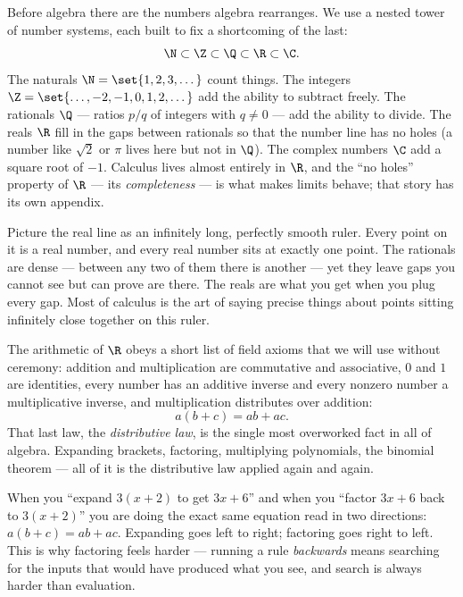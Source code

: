 Before algebra there are the numbers algebra rearranges. We use a nested tower of
number systems, each built to fix a shortcoming of the last:
\[
  \N \subset \Z \subset \Q \subset \R \subset \C.
\]
The naturals $\N = \set{1,2,3,\dots}$ count things. The integers
$\Z = \set{\dots,-2,-1,0,1,2,\dots}$ add the ability to subtract freely. The
rationals $\Q$ --- ratios $p/q$ of integers with $q \neq 0$ --- add the ability to
divide. The reals $\R$ fill in the gaps between rationals so that the number line
has no holes (a number like $\sqrt 2$ or $\pi$ lives here but not in $\Q$). The
complex numbers $\C$ add a square root of $-1$. Calculus lives almost entirely in
$\R$, and the ``no holes'' property of $\R$ --- its \emph{completeness} --- is
what makes limits behave; that story has its own appendix.

\begin{intuitionbox}
Picture the real line as an infinitely long, perfectly smooth ruler. Every point
on it is a real number, and every real number sits at exactly one point. The
rationals are dense --- between any two of them there is another --- yet they leave
gaps you cannot see but can prove are there. The reals are what you get when you
plug every gap. Most of calculus is the art of saying precise things about points
sitting infinitely close together on this ruler.
\end{intuitionbox}

The arithmetic of $\R$ obeys a short list of field axioms that we will use without
ceremony: addition and multiplication are commutative and associative, $0$ and $1$
are identities, every number has an additive inverse and every nonzero number a
multiplicative inverse, and multiplication distributes over addition:
\[
  a(b+c) = ab + ac.
\]
That last law, the \emph{distributive law}, is the single most overworked fact in
all of algebra. Expanding brackets, factoring, multiplying polynomials, the
binomial theorem --- all of it is the distributive law applied again and again.

\begin{happeningbox}
When you ``expand $3(x+2)$ to get $3x+6$'' and when you ``factor $3x+6$ back to
$3(x+2)$'' you are doing the exact same equation read in two directions:
$a(b+c) = ab+ac$. Expanding goes left to right; factoring goes right to left.
This is why factoring feels harder --- running a rule \emph{backwards} means
searching for the inputs that would have produced what you see, and search is
always harder than evaluation.
\end{happeningbox}

